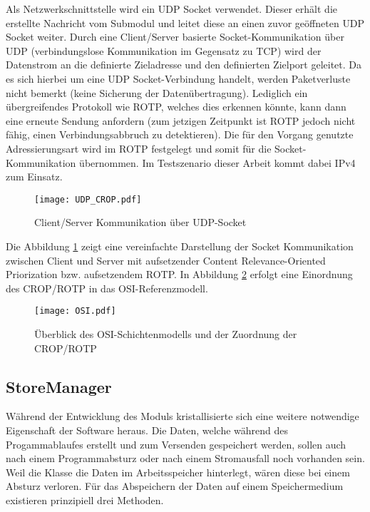 Als Netzwerkschnittstelle wird ein \gls{UDP} Socket verwendet. Dieser erh{\"a}lt die
erstellte Nachricht vom Submodul  und leitet diese an einen
zuvor ge{\"o}ffneten \gls{UDP} Socket weiter. Durch eine Client/Server basierte
Socket-Kommunikation {\"u}ber \gls{UDP} (verbindungslose Kommunikation im Gegensatz
zu \gls{TCP}) wird der Datenstrom an die definierte Zieladresse und den
definierten Zielport geleitet. Da es sich hierbei um eine \gls{UDP} Socket-Verbindung handelt,
werden Paketverluste nicht bemerkt (keine Sicherung der Daten{\"u}bertragung).
Lediglich ein {\"u}bergreifendes Protokoll wie \gls{ROTP}, welches dies erkennen
k{\"o}nnte, kann dann eine erneute Sendung anfordern (zum jetzigen Zeitpunkt
ist \gls{ROTP} jedoch nicht f{\"a}hig, einen Verbindungsabbruch zu detektieren).
Die f{\"u}r den Vorgang genutzte Adressierungsart wird im \gls{ROTP} festgelegt
und somit f{\"u}r die Socket-Kommunikation {\"u}bernommen. Im Testszenario
dieser Arbeit kommt dabei IPv4 zum Einsatz.

\begin{figure}[H]
\centering
\texttt{[image: UDP\_CROP.pdf]}
\caption{Client/Server Kommunikation {\"u}ber UDP-Socket}
\label{fig:Socket-Kommunikation}
\end{figure}

Die Abbildung \ref{fig:Socket-Kommunikation} zeigt eine vereinfachte Darstellung
der Socket Kommunikation zwischen Client und Server mit aufsetzender Content
Relevance-Oriented Priorization bzw. aufsetzendem \gls{ROTP}. In Abbildung
\ref{fig:OSI} erfolgt eine Einordnung des \gls{CROP}/\gls{ROTP} in das OSI-Referenzmodell.

\begin{figure}[H]
\centering
\texttt{[image: OSI.pdf]}
\caption{{\"U}berblick des OSI-Schichtenmodells und der Zuordnung der CROP/ROTP}
\label{fig:OSI}
\end{figure}

\subsection{StoreManager}

W{\"a}hrend der Entwicklung des Moduls  kristallisierte sich eine
weitere notwendige Eigenschaft der Software heraus.
Die Daten, welche w{\"a}hrend des Progammablaufes erstellt und zum Versenden
gespeichert werden, sollen auch nach einem Programmabsturz oder nach einem
Stromausfall noch vorhanden sein. Weil die Klasse 
die Daten im Arbeitsspeicher hinterlegt, w{\"a}ren diese bei einem Absturz
verloren.
F{\"u}r das Abspeichern der Daten auf einem Speichermedium existieren
prinzipiell drei Methoden.

